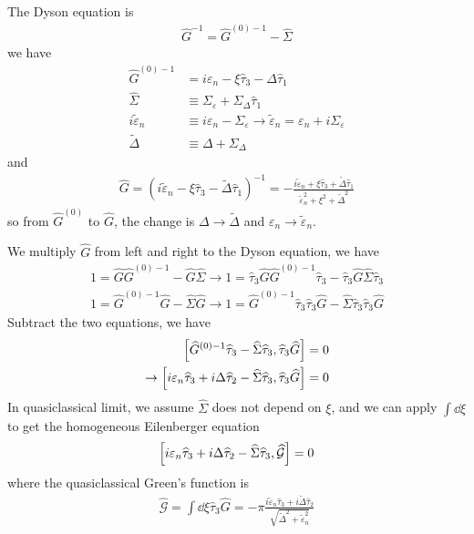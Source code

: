 \documentclass[]{article}
\begin{document}
The Dyson equation is
\begin{align}
    \widehat{G}^{-1} = \widehat{G}^{(0)-1} - \widehat{\Sigma}
\end{align}
we have
\begin{align}
    \widehat{G}^{(0)-1}    & = i\varepsilon_n - \xi\widehat{\tau}_3 - \Delta\widehat{\tau}_1 \\
    \widehat{\Sigma}       & \equiv \Sigma_\varepsilon + \Sigma_\Delta \widehat{\tau}_1      \\
    i\tilde{\varepsilon}_n & \equiv i\varepsilon_n - \Sigma_\varepsilon
    \rightarrow \tilde{\varepsilon}_n = \varepsilon_n + i\Sigma_\varepsilon                  \\
    \tilde{\Delta}         & \equiv \Delta + \Sigma_\Delta
\end{align}
and
\begin{align}
    \widehat{G} = (i\tilde{\varepsilon}_n - \xi\widehat{\tau}_3 - \tilde{\Delta}\widehat{\tau}_1)^{-1}
    = - \frac{i\tilde{\varepsilon}_n + \xi\widehat{\tau}_3 + \tilde{\Delta}\widehat{\tau}_1}
    {\tilde{\varepsilon}_n^2 + \xi^2 + \tilde{\Delta}^2}
\end{align}
so from $\widehat{G}^{(0)}$ to $\widehat{G}$, the change is $\Delta \rightarrow \tilde{\Delta}$
and $\varepsilon_n \rightarrow \tilde{\varepsilon}_n$.

We multiply $\widehat{G}$ from left and right to the Dyson equation, we have
\begin{align}
    1 = \widehat{G}\widehat{G}^{(0)-1} - \widehat{G}\widehat{\Sigma} \rightarrow
    1 = \widehat{\tau}_3 \widehat{G}\widehat{G}^{(0)-1} \widehat{\tau}_3
    - \widehat{\tau}_3 \widehat{G}\widehat{\Sigma} \widehat{\tau}_3 \\
    1 = \widehat{G}^{(0)-1}\widehat{G} - \widehat{\Sigma}\widehat{G} \rightarrow
    1 = \widehat{G}^{(0)-1}\widehat{\tau}_3\widehat{\tau}_3\widehat{G}
    - \widehat{\Sigma}\widehat{\tau}_3\widehat{\tau}_3\widehat{G}
\end{align}
Subtract the two equations, we have
\begin{align}
    \comm{\widehat{G}^{(0)-1}\widehat{\tau}_3-\widehat{\Sigma}\widehat{\tau}_3}{\widehat{\tau}_3\widehat{G}} & = 0 \\
    \rightarrow \comm{i\varepsilon_n\widehat{\tau}_3 + i\Delta\widehat{\tau}_2 - \widehat{\Sigma}\widehat{\tau}_3}
    {\widehat{\tau}_3\widehat{G}}                                                                            & = 0
\end{align}
In quasiclassical limit, we assume $\widehat{\Sigma}$ does not depend on $\xi$, and we can apply $\int\dd\xi$ to get the
homogeneous Eilenberger equation
\begin{align}
    \comm{i\varepsilon_n\widehat{\tau}_3 + i\Delta\widehat{\tau}_2 - \widehat{\Sigma}\widehat{\tau}_3}
    {\widehat{\mathcal{G}}} = 0
\end{align}
where the quasiclassical Green's function is
\begin{align}
    \widehat{\mathcal{G}} = \int\dd\xi\widehat{\tau}_3\widehat{G}
    = -\pi\frac{i\tilde{\varepsilon}_n\widehat{\tau}_3 + i\tilde{\Delta}\widehat{\tau}_2}
    {\sqrt{\tilde{\Delta}^2 + \tilde{\varepsilon}_n^2}}
\end{align}
\end{document}
